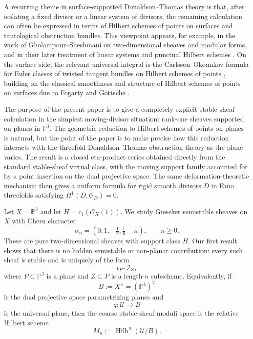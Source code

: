 \documentclass[12pt]{amsart}
\numberwithin{equation}{section}
\newcommand{\PP}{\mathbb{P}}
\newcommand{\OO}{\mathcal{O}}
\newcommand{\I}{\mathcal{I}}
\newcommand{\Hilb}{\operatorname{Hilb}}
\newcommand{\dual}{\vee}
\theoremstyle{plain}
\theoremstyle{definition}
\theoremstyle{remark}
\begin{document}
A recurring theme in surface-supported Donaldson--Thomas theory is that, after isolating a fixed divisor or a linear system of divisors, the remaining calculation can often be expressed in terms of Hilbert schemes of points on surfaces and tautological obstruction bundles.
This viewpoint appears, for example, in the work of Gholampour--Sheshmani on two-dimensional sheaves and modular forms, and in their later treatment of linear systems and punctual Hilbert schemes \cite{GSmod,GSlinear}.
On the surface side, the relevant universal integral is the Carlsson--Okounkov formula for Euler classes of twisted tangent bundles on Hilbert schemes of points \cite{CO}, building on the classical smoothness and structure of Hilbert schemes of points on surfaces due to Fogarty and G\"ottsche \cite{Fogarty,Gottsche}.

The purpose of the present paper is to give a completely explicit stable-sheaf calculation in the simplest moving-divisor situation: rank-one sheaves supported on planes in $\PP^3$.
The geometric reduction to Hilbert schemes of points on planes is natural, but the point of the paper is to make precise how this reduction interacts with the threefold Donaldson--Thomas obstruction theory as the plane varies.
The result is a closed eta-product series obtained directly from the standard stable-sheaf virtual class, with the moving support family accounted for by a point insertion on the dual projective space.
The same deformation-theoretic mechanism then gives a uniform formula for rigid smooth divisors $D$ in Fano threefolds satisfying $H^1(D,\OO_D)=0$.

Let $X=\PP^3$ and let $H=c_1(\OO_X(1))$.
We study Gieseker semistable sheaves on $X$ with Chern character
\begin{equation}\label{eq:intro-alpha}
\alpha_n=(0,1,-\tfrac12,\tfrac16-n),\qquad n\ge 0.
\end{equation}
These are pure two-dimensional sheaves with support class $H$.
Our first result shows that there is no hidden semistable or non-planar contribution: every such sheaf is stable and is uniquely of the form
\[
\iota_{P*}\I_Z,
\]
where $P\subset \PP^3$ is a plane and $Z\subset P$ is a length-$n$ subscheme.
Equivalently, if
\[
B:=X^\dual=(\PP^3)^\dual
\]
is the dual projective space parametrizing planes and
\[
q\colon \mathcal U\longrightarrow B
\]
is the universal plane, then the coarse stable-sheaf moduli space is the relative Hilbert scheme
\[
M_n:=\Hilb^n(\mathcal U/B).
\]
\end{document}
